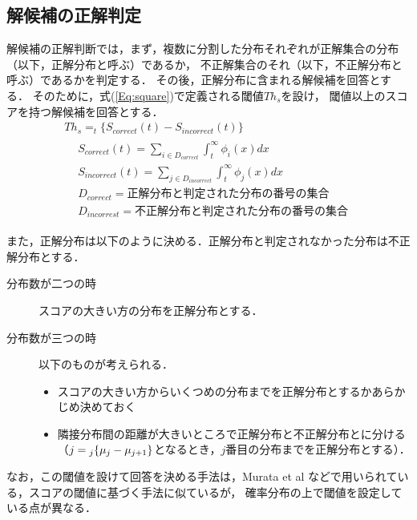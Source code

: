 \documentclass[japanese]{jnlp_1.4}
\newcommand{\argmax}{}
\begin{document}
\subsection{解候補の正解判定}\label{sec:回答判定}

解候補の正解判断では，まず，複数に分割した分布それぞれが正解集合の分布（以下，正解分布と呼ぶ）であるか，
不正解集合のそれ（以下，不正解分布と呼ぶ）であるかを判定する．
その後，正解分布に含まれる解候補を回答とする．
そのために，式(\ref{Eq:square})で定義される閾値$Th_s$を設け，
閾値以上のスコアを持つ解候補を回答とする．
\begin{gather}
Th_s = \argmax_t \{S_{correct}(t)-S_{incorrect}(t)\}
\label{Eq:square} \\
\begin{split}
{}& S_{correct}(t)= \sum_{i\in D_{correct}} \int^{\infty}_{t} \phi_i(x) dx \\
{}& S_{incorrect}(t)= \sum_{j\in D_{incorrect}} \int^{\infty}_{t} \phi_j(x) dx \\
{}& D_{correct} = 正解分布と判定された分布の番号の集合 \\
{}& D_{incorrest} = 不正解分布と判定された分布の番号の集合
\nonumber
\end{split}
\end{gather}

また，正解分布は以下のように決める．正解分布と判定されなかった分布は不正解分布とする．
\begin{description}
\item [分布数が二つの時] スコアの大きい方の分布を正解分布とする．
\item [分布数が三つの時] 以下のものが考えられる．
\begin{itemize}
\item スコアの大きい方からいくつめの分布までを正解分布とするかあらかじめ決めておく
\item 隣接分布間の距離が大きいところで正解分布と不正解分布とに分ける（$j=\linebreak\argmax_j \{\mu_j-\mu_{j+1}\}$となるとき，$j$番目の分布までを正解分布とする）．
\end{itemize} 
\end{description}

なお，この閾値を設けて回答を決める手法は，Murata et al \cite{Murata:JapaneseQAsystemUsingDecreasedAddingwithMultipleAnswers}などで用いられている，スコアの閾値に基づく手法に似ているが，
確率分布の上で閾値を設定している点が異なる．

\vspace{-0.5\baselineskip}
\end{document}
